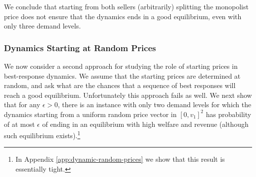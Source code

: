 \documentclass[11pt,a4paper]{article}
\begin{document}
We conclude that starting from both sellers (arbitrarily) splitting the monopolist price does not ensure that the dynamics ends in a good equilibrium, even with only  three demand levels.

\subsubsection{Dynamics Starting at Random Prices }

We now consider a second approach for studying the role of starting prices in best-response dynamics. We assume that the starting prices are determined at random, and ask what are the chances that a sequence of best responses will reach a good equilibrium.
Unfortunately this approach fails as well. We next show that for any $\epsilon>0$, there is an instance with only two demand levels for which the dynamics starting from a uniform random price vector in $[0,v_1]^2$ has probability of at most $\epsilon$ of ending in an equilibrium with high welfare and revenue (although such equilibrium exists).\footnote{
In Appendix \ref{app:dynamic-random-prices} we show that this result is essentially tight.
}

\end{document}
